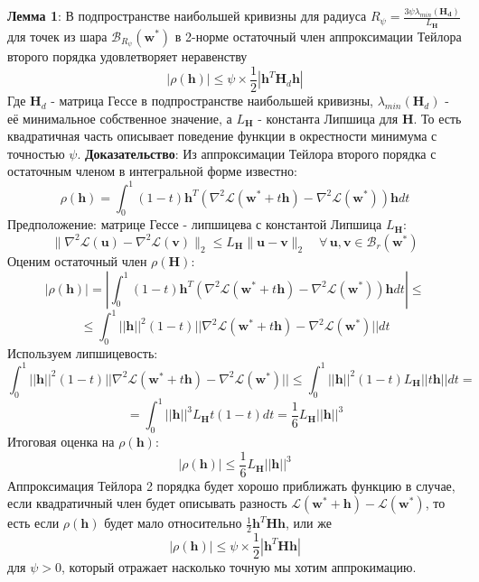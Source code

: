 \documentclass[11pt,a4paper]{article}
\begin{document}
\textbf{Лемма 1}: В подпространстве наибольшей кривизны для радиуса $R_{\psi} = \frac{3\psi \lambda_{min}(\mathbf{H_d})}{L_{\mathbf{H}}}$ для точек из шара $\mathcal{B}_{R_{\psi}}(\mathbf{w}^*)$ в 2-норме остаточный член аппроксимации Тейлора второго порядка удовлетворяет неравенству $$|\rho(\mathbf{h})| \leq \psi \times\frac{1}{2}|\mathbf{h}^T\mathbf{H}_d\mathbf{h}|$$\newline
Где $\mathbf{H}_d$ - матрица Гессе в подпространстве наибольшей кривизны, $\lambda_{min}(\mathbf{H}_d)$ - её минимальное собственное значение, а $L_{\mathbf{H}}$ - константа Липшица для $\mathbf{H}$. \newline
То есть квадратичная часть описывает поведение функции в окрестности минимума с точностью $\psi$. \newline
\textbf{Доказательство}: \newline
Из аппроксимации Тейлора второго порядка с остаточным членом в интегральной форме известно:
$$\displaystyle \rho(\mathbf{h}) =  \int_0^1 (1-t)\mathbf{h}^T ( \nabla^2\mathcal{L}(\mathbf{w}^* + t \mathbf{h})-\nabla^2\mathcal{L}(\mathbf{w}^*))\mathbf{h}dt $$
Предположение: матрице Гессе - липшицева с константой Липшица $L_{\mathbf{H}}$:
$$\|\nabla^2 \mathcal{L}(\mathbf{u}) - \nabla^2 \mathcal{L}(\mathbf{v})\|_2 \le L_\mathbf{H} \|\mathbf{u} - \mathbf{v}\|_2 \quad \forall\, \mathbf{u}, \mathbf{v} \in \mathcal{B}_r(\mathbf{w}^*)$$
Оценим остаточный член $\rho(\mathbf{H})$:
$$\displaystyle |\rho(\mathbf{h})| =  \left|\int_0^1 (1-t)\mathbf{h}^T ( \nabla^2\mathcal{L}(\mathbf{w}^* + t \mathbf{h})-\nabla^2\mathcal{L}(\mathbf{w}^*))\mathbf{h}dt \right| \leq$$ $$\leq \int_0^1 ||\mathbf{h}||^2(1-t) || \nabla^2\mathcal{L}(\mathbf{w}^* + t \mathbf{h})-\nabla^2\mathcal{L}(\mathbf{w}^*)||dt$$
Используем липшицевость:
$$ \int_0^1 ||\mathbf{h}||^2(1-t) || \nabla^2\mathcal{L}(\mathbf{w}^* + t \mathbf{h})-\nabla^2\mathcal{L}(\mathbf{w}^*)|| \leq \int_0^1 ||\mathbf{h}||^2(1-t)L_{\mathbf{H}} ||t\mathbf{h}||dt=$$ $$ = \int_0^1||\mathbf{h}||^3L_{\mathbf{H}}t(1-t)dt=\frac{1}{6}L_{\mathbf{H}}||\mathbf{h}||^3$$
Итоговая оценка на $\rho(\mathbf{h})$:
$$|\rho(\mathbf{h})| \leq \frac{1}{6}L_{\mathbf{H}}||\mathbf{h}||^3$$ \newline
Аппроксимация Тейлора 2 порядка будет хорошо приближать функцию в случае, если квадратичный член будет описывать разность $\mathcal{L}(\mathbf{w}^* + \mathbf{h}) - \mathcal{L}(\mathbf{w}^*)$, то есть если $\rho(\mathbf{h})$ будет мало относительно $\frac{1}{2}\mathbf{h}^T\mathbf{H}\mathbf{h}$, или же $$|\rho(\mathbf{h})| \leq \psi \times\frac{1}{2}|\mathbf{h}^T\mathbf{H}\mathbf{h}|$$ для $\psi > 0$, который отражает насколько точную мы хотим аппрокимацию. \newline
\end{document}
